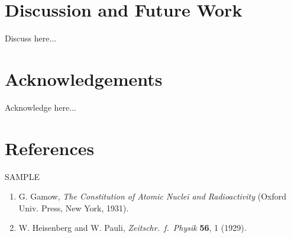 \documentclass[12pt]{article}
\begin{document}

\section*{Discussion and Future Work}

Discuss here...

\section*{Acknowledgements}

Acknowledge here...

\section*{References}

SAMPLE

\begin{enumerate}
\item G. Gamow, {\it The Constitution of Atomic Nuclei and
Radioactivity\/} (Oxford Univ. Press, New York, 1931).
\item W. Heisenberg and W. Pauli, {\it Zeitschr.\ f.\ Physik} {\bf 56},
1 (1929).
\end{enumerate}
\end{document}
